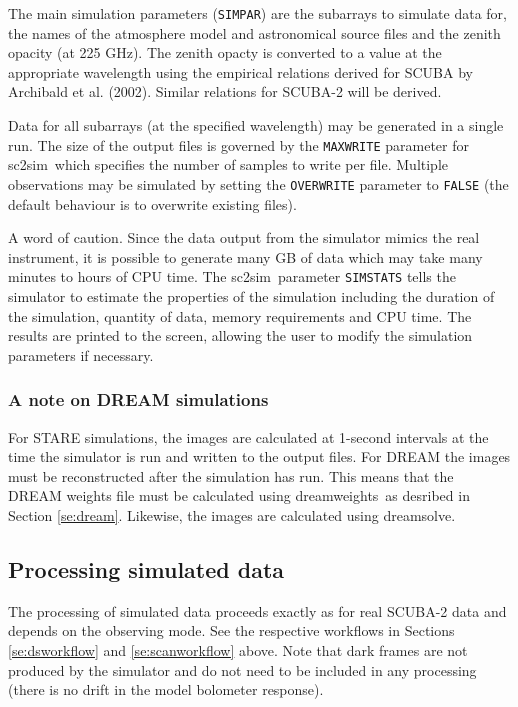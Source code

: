 \documentclass[twoside,11pt]{article}
\newcommand{\xref}[3]{#1}
\newcommand{\xlabel}[1]{}
\renewcommand{\_}{\texttt{\symbol{95}}}
\newcommand{\task}[1]{\textsf{#1}}
\newcommand{\dreamsolve}{\xref{\task{dreamsolve}}{sun258}{DREAMSOLVE}}
\newcommand{\dreamweights}{\xref{\task{dreamweights}}{sun258}{DREAMWEIGHTS}}
\newcommand{\sctwosim}{\xref{\task{sc2sim}}{sun258}{SC2SIM}}
\begin{document}
The main simulation parameters (\texttt{SIMPAR}) are the subarrays to
simulate data for, the names of the atmosphere model and astronomical
source files and the zenith opacity (at 225 GHz). The zenith opacty is
converted to a value at the appropriate wavelength using the empirical
relations derived for SCUBA by Archibald et al. (2002). Similar
relations for SCUBA-2 will be derived.

Data for all subarrays (at the specified wavelength) may be generated
in a single run. The size of the output files is governed by the
\texttt{MAXWRITE} parameter for \sctwosim\ which specifies the number
of samples to write per file. Multiple observations may be simulated
by setting the \texttt{OVERWRITE} parameter to \texttt{FALSE} (the
default behaviour is to overwrite existing files).

A word of caution. Since the data output from the simulator mimics the
real instrument, it is possible to generate many GB of data which may
take many minutes to hours of CPU time. The \sctwosim\ parameter
\texttt{SIMSTATS} tells the simulator to estimate the properties of
the simulation including the duration of the simulation, quantity of
data, memory requirements and CPU time. The results are printed to the
screen, allowing the user to modify the simulation parameters if
necessary.

\subsubsection{\xlabel{dreamsim}A note on DREAM simulations\label{se:dreamsim}}

For STARE simulations, the images are calculated at 1-second intervals
at the time the simulator is run and written to the output files. For
DREAM the images must be reconstructed after the simulation has
run. This means that the DREAM weights file must be calculated using
\dreamweights\ as desribed in Section \ref{se:dream}. Likewise, the
images are calculated using \dreamsolve.

\subsection{\xlabel{simdr}Processing simulated data\label{se:simdr}}

The processing of simulated data proceeds exactly as for real SCUBA-2
data and depends on the observing mode. See the respective workflows
in Sections \ref{se:dsworkflow} and \ref{se:scanworkflow} above. Note
that dark frames are not produced by the simulator and do not need to
be included in any processing (there is no drift in the model
bolometer response).
\end{document}
